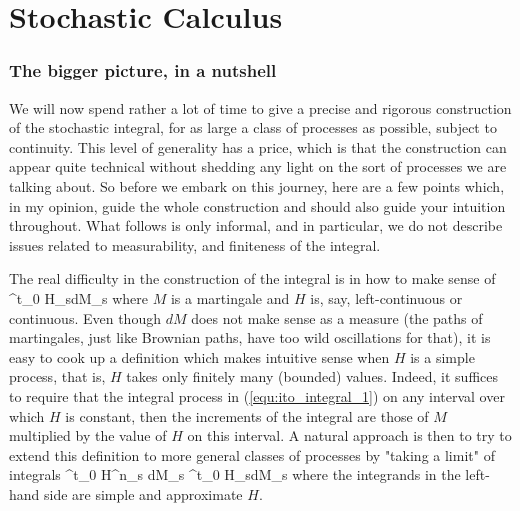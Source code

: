 
\chapter{Stochastic Calculus}

\subsection{The bigger picture, in a nutshell}

We will now spend rather a lot of time to give a precise and rigorous construction of the stochastic integral, for as large a class of processes as possible, subject to continuity. This level of generality has a price, which is that the construction can appear quite technical without shedding any light on the sort of processes we are talking about. So before we embark on this journey, here are a few points which, in my opinion, guide the whole construction and should also guide your intuition throughout. What follows is only informal, and in particular, we do not describe issues related to measurability, and finiteness of the integral.

The real difficulty in the construction of the integral is in how to make sense of
\be\label{equ:ito_integral_1}
\int^t_0 H_sdM_s 
\ee
where $M$ is a martingale and $H$ is, say, left-continuous or continuous. Even though $dM$ does not make sense as a measure (the paths of martingales, just like Brownian paths, have too wild oscillations for that), it is easy to cook up a definition which makes intuitive sense when $H$ is a simple process, that is, $H$ takes only finitely many (bounded) values. Indeed, it suffices to require that the integral process in (\ref{equ:ito_integral_1}) on any interval over which $H$ is constant, then the increments of the integral are those of $M$ multiplied by the value of $H$ on this interval. A natural approach is then to try to extend this definition to more general classes of processes by "taking a limit" of integrals
\be\label{equ:ito_integral_2}
\int^t_0 H^n_s dM_s \to \int^t_0 H_sdM_s
\ee
where the integrands in the left-hand side are simple and approximate $H$.

